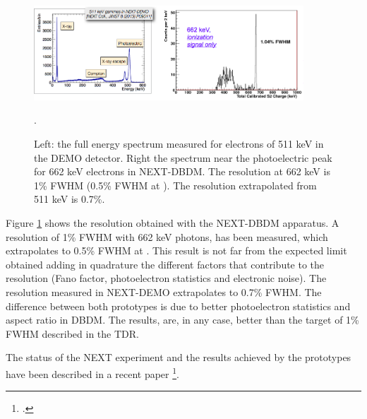 \begin{figure}
\centering
\includegraphics[width=0.9\textwidth]{img/EResolution.png}
\caption{\small Left: the full energy spectrum measured for electrons of 511 keV in the DEMO detector. Right the spectrum near the photoelectric peak for 662 keV electrons in NEXT-DBDM. The resolution at 662 keV is 1\% FWHM (0.5\% FWHM at \Qbb). The resolution extrapolated from 511 keV is 0.7\%.}\label{fig.ERES}. 
\end{figure}

Figure \ref{fig.ERES} shows the resolution obtained with the NEXT-DBDM apparatus. A resolution of 1\% FWHM with 
662 keV photons, has been measured, which extrapolates to 0.5\% FWHM at \Qbb. This result is not far from the expected limit obtained adding in quadrature the different factors that contribute to the resolution (Fano factor, photoelectron statistics and electronic noise). The resolution measured in NEXT-DEMO extrapolates to 0.7\% FWHM. The difference between both prototypes is due to better photoelectron statistics and aspect ratio in DBDM. The results, are, in any case, better than the target of 1\% FWHM described in the TDR.

The status of the NEXT experiment and the results achieved by the prototypes have been described in a recent
paper \footcite{Gomez-Cadenas:2013lta}.

